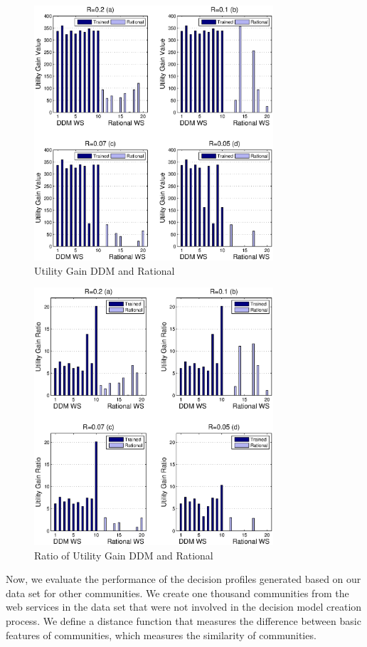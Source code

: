 \begin{figure}%
\centering
\includegraphics[width=3.5in]{figures/utility_gain.eps}
\caption{Utility Gain DDM and Rational}
\label{utility_gain_mlisa_and_rational}
\end{figure}

\begin{figure}%
\centering
\includegraphics[width=3.5in]{figures/utility_ratio.eps}
\caption{Ratio of Utility Gain DDM and Rational}
\label{utility_gain_mlisa_and_rational_ratio}
\end{figure}

Now, we evaluate the performance of the decision profiles generated based on our data set for other communities.%
We create one thousand communities from the web services in the data set that were not involved in the decision model creation process. We define a distance function that measures the difference between basic features of communities, which measures the similarity of communities.

